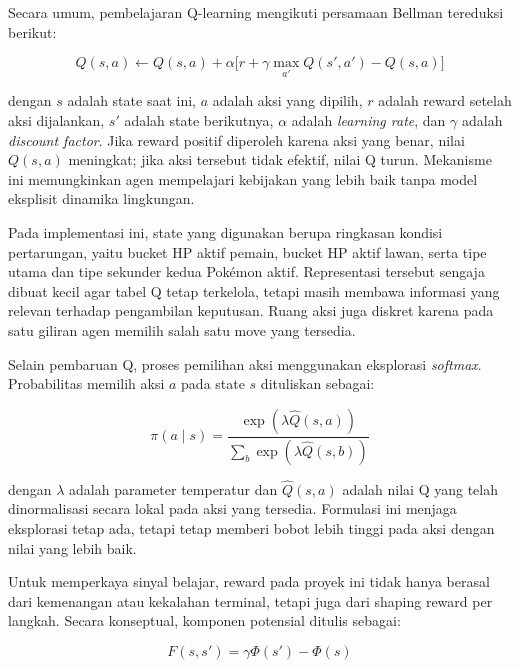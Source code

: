 \documentclass[11pt,a4paper,oneside]{report}
\begin{document}
Secara umum, pembelajaran Q-learning mengikuti persamaan Bellman tereduksi berikut:

\begin{equation}
\label{eq:persamaan-utama}
Q(s,a) \leftarrow Q(s,a) + \alpha \bigl[r + \gamma \max_{a'} Q(s',a') - Q(s,a)\bigr]
\end{equation}

dengan \(s\) adalah state saat ini, \(a\) adalah aksi yang dipilih, \(r\) adalah reward setelah aksi dijalankan, \(s'\) adalah state berikutnya, \(\alpha\) adalah \textit{learning rate}, dan \(\gamma\) adalah \textit{discount factor}. Jika reward positif diperoleh karena aksi yang benar, nilai \(Q(s,a)\) meningkat; jika aksi tersebut tidak efektif, nilai Q turun. Mekanisme ini memungkinkan agen mempelajari kebijakan yang lebih baik tanpa model eksplisit dinamika lingkungan.

Pada implementasi ini, state yang digunakan berupa ringkasan kondisi pertarungan, yaitu bucket HP aktif pemain, bucket HP aktif lawan, serta tipe utama dan tipe sekunder kedua Pokémon aktif. Representasi tersebut sengaja dibuat kecil agar tabel Q tetap terkelola, tetapi masih membawa informasi yang relevan terhadap pengambilan keputusan. Ruang aksi juga diskret karena pada satu giliran agen memilih salah satu move yang tersedia.

Selain pembaruan Q, proses pemilihan aksi menggunakan eksplorasi \textit{softmax}. Probabilitas memilih aksi \(a\) pada state \(s\) dituliskan sebagai:

\begin{equation}
\label{eq:softmax-policy}
\pi(a\mid s) = \frac{\exp(\lambda \hat{Q}(s,a))}{\sum_b \exp(\lambda \hat{Q}(s,b))}
\end{equation}

dengan \(\lambda\) adalah parameter temperatur dan \(\hat{Q}(s,a)\) adalah nilai Q yang telah dinormalisasi secara lokal pada aksi yang tersedia. Formulasi ini menjaga eksplorasi tetap ada, tetapi tetap memberi bobot lebih tinggi pada aksi dengan nilai yang lebih baik.

Untuk memperkaya sinyal belajar, reward pada proyek ini tidak hanya berasal dari kemenangan atau kekalahan terminal, tetapi juga dari shaping reward per langkah. Secara konseptual, komponen potensial ditulis sebagai:

\begin{equation}
\label{eq:potential-shaping}
F(s,s') = \gamma \Phi(s') - \Phi(s)
\end{equation}
\end{document}
